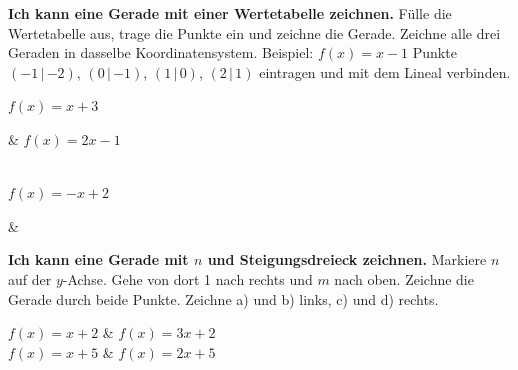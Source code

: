 \begin{aufgabe}{\textbf{Ich kann eine Gerade mit einer Wertetabelle zeichnen.} Fülle die Wertetabelle aus, trage die Punkte ein und zeichne die Gerade. Zeichne alle drei Geraden in dasselbe Koordinatensystem.}
Beispiel: $f(x) = x - 1$ \quad
{}
Punkte $(-1\,|\,{-2})$, $(0\,|\,{-1})$, $(1\,|\,0)$, $(2\,|\,1)$ eintragen und mit dem Lineal verbinden.
\begin{teilezwei}
\tz $f(x) = x + 3$ \par {} & \tz $f(x) = 2x - 1$ \par {} \\
\tz $f(x) = -x + 2$ \par {} & \\
\end{teilezwei}

\begin{ksys}[xmin=-2,xmax=3,ymin=-4,ymax=6]
\end{ksys}

\end{aufgabe}

\begin{aufgabe}{\textbf{Ich kann eine Gerade mit $n$ und Steigungsdreieck zeichnen.} Markiere $n$ auf der $y$-Achse. Gehe von dort 1 nach rechts und $m$ nach oben. Zeichne die Gerade durch beide Punkte. Zeichne a) und b) links, c) und d) rechts.}
\begin{teilezwei}
\tz $f(x) = x + 2$ & \tz $f(x) = 3x + 2$ \\
\tz $f(x) = x + 5$ & \tz $f(x) = 2x + 5$ \\
\end{teilezwei}

\begin{ksys}[xmin=-3,xmax=3,ymin=-1,ymax=8]
\end{ksys}\ksysabstand\begin{ksys}[xmin=-3,xmax=3,ymin=-1,ymax=8]
\end{ksys}

\end{aufgabe}

